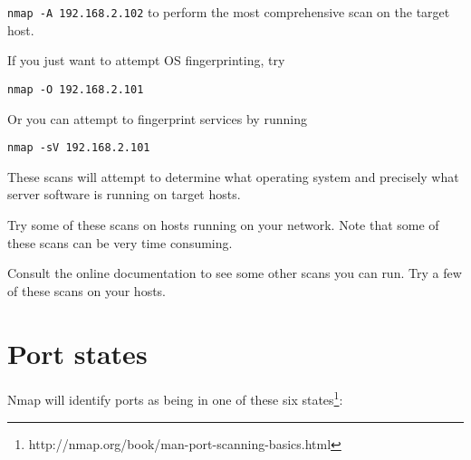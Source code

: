 \documentclass{article}
\begin{document}
\texttt{nmap -A 192.168.2.102} to perform the most comprehensive scan on the 
target host.

If you just want to attempt OS fingerprinting, try 

\texttt{nmap -O 192.168.2.101}

Or you can attempt to fingerprint services by running

\texttt{nmap -sV 192.168.2.101}

These scans will attempt to determine what operating system and precisely what server software is running on target hosts.

Try some of these scans on hosts running on your network.  Note that some of these scans can be very time consuming.

Consult the online documentation to see some other scans you can run. Try a few of these scans on your hosts.

\section{Port states}
Nmap will identify ports as being in one of these six states\footnote{http://nmap.org/book/man-port-scanning-basics.html}:
\end{document}
